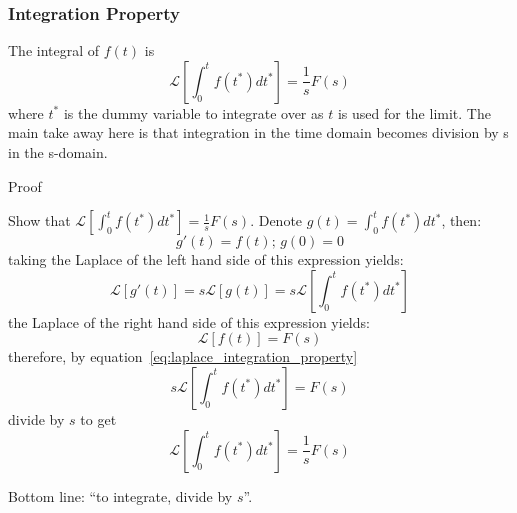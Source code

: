 \documentclass[12pt,letter]{article}
\numberwithin{ex}{section} %
\numberwithin{re}{section} %
\newcommand{\gr}[1]{\textcolor[rgb]{0.00,0.50,0.00}{#1}}
\newcommand{\Laplace}[1]{\ensuremath{\mathcal{L}{\left[#1\right]}}}
\numberwithin{equation}{section}	%
\begin{document}
\subsubsection{Integration Property}

The integral of $f(t)$ is
\begin{equation}
\Laplace{\int_{0}^{t}f(t^*)dt^*} = \frac{1}{s}F(s)
\end{equation}
where $t^*$ is the dummy variable to integrate over as $t$ is used for the limit.  The main take away here is that integration in the time domain becomes division by s in the s-domain.

\begin{mdframed}[middlelinewidth=0.5mm]
\begin{center}
\gr{Proof}
\end{center}

\noindent Show that $\Laplace{\int_{0}^{t}f(t^*)dt^*} = \frac{1}{s}F(s)$. Denote $g(t) =  \int_{0}^{t}f(t^*)dt^*$, then:
\begin{equation}
g'(t) = f(t)\text{; } g(0) = 0
\label{eq:laplace_integration_property}
\end{equation}
taking the Laplace of the left hand side of this expression yields:
\begin{equation}
\Laplace{g'(t)} = s\Laplace{g(t)} = s \Laplace{\int_{0}^{t}f(t^*)dt^*}
\end{equation}
the Laplace of the right hand side of this expression yields:
\begin{equation}
\Laplace{f(t)} = F(s)
\end{equation}
therefore, by equation~\ref{eq:laplace_integration_property} 
\begin{equation}
s \Laplace{\int_{0}^{t}f(t^*)dt^*} = F(s)
\end{equation}
divide by $s$ to get 
\begin{equation}
\Laplace{\int_{0}^{t}f(t^*)dt^*} = \frac{1}{s}F(s)
\end{equation}

Bottom line: ``to integrate, divide by $s$''. 
\end{mdframed}
\end{document}
